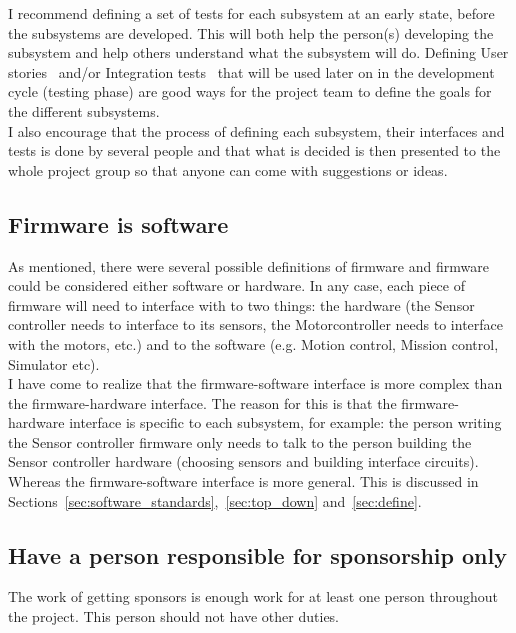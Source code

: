 I recommend defining a set of tests for each subsystem at an early state, before the subsystems are developed.
This will both help the person(s) developing the subsystem and help others understand what the subsystem will do. 
Defining User stories~\cite{web:wiki_user_story} and/or Integration tests~\cite{web:wiki_integration_testing} that will be used later on in the development cycle (testing phase) are good ways for the project team to define the goals for the different subsystems. \\
I also encourage that the process of defining each subsystem, their interfaces and tests is done by several people and that what is decided is then presented to the whole project group so that anyone can come with suggestions or ideas.


\subsection{Firmware is software}\label{sec:firmware}
As mentioned, there were several possible definitions of firmware and firmware could be considered either software or hardware. %
In any case, each piece of firmware will need to interface with to two things: the hardware (the Sensor controller needs to interface to its sensors, the Motorcontroller needs to interface with the motors, etc.) and to the software (e.g. Motion control, Mission control, Simulator etc). \\
I have come to realize that the firmware-software interface is more complex than the firmware-hardware interface. The reason for this is that the firmware-hardware interface is specific to each subsystem, for example: the person writing the Sensor controller firmware only needs to talk to the person building the Sensor controller hardware (choosing sensors and building interface circuits). Whereas the firmware-software interface is more general. This is discussed in Sections~\ref{sec:software_standards},~\ref{sec:top_down} and~\ref{sec:define}.


\subsection{Have a person responsible for sponsorship only}
The work of getting sponsors is enough work for at least one person throughout the project. This person should not have other duties.


